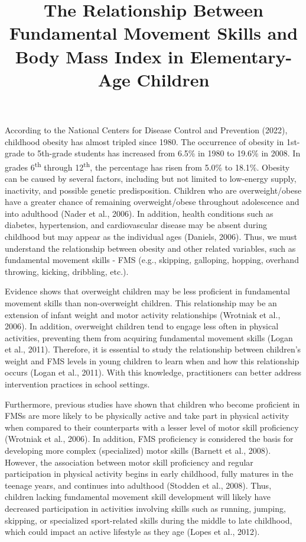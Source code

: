 \documentclass[
  jou,
  colorlinks=true,linkcolor=blue,citecolor=blue,urlcolor=blue]{apa7}
\title{The Relationship Between Fundamental Movement Skills and Body
Mass Index in Elementary-Age Children}
\date{}
\begin{document}
\maketitle
\ifdefined\Shaded\renewenvironment{Shaded}{\begin{tcolorbox}[boxrule=0pt, interior hidden, borderline west={3pt}{0pt}{shadecolor}, enhanced, frame hidden, breakable, sharp corners]}{\end{tcolorbox}}\fi
According to the National Centers for Disease Control and Prevention
(2022), childhood obesity has almost tripled since 1980. The occurrence
of obesity in 1st-grade to 5th-grade students has increased from 6.5\%
in 1980 to 19.6\% in 2008. In grades 6\textsuperscript{th} through
12\textsuperscript{th}, the percentage has risen from 5.0\% to 18.1\%.
Obesity can be caused by several factors, including but not limited to
low-energy supply, inactivity, and possible genetic predisposition.
Children who are overweight/obese have a greater chance of remaining
overweight/obese throughout adolescence and into adulthood (Nader et
al., 2006). In addition, health conditions such as diabetes,
hypertension, and cardiovascular disease may be absent during childhood
but may appear as the individual ages (Daniels, 2006). Thus, we must
understand the relationship between obesity and other related variables,
such as fundamental movement skills - FMS (e.g., skipping, galloping,
hopping, overhand throwing, kicking, dribbling, etc.).

Evidence shows that overweight children may be less proficient in
fundamental movement skills than non-overweight children. This
relationship may be an extension of infant weight and motor activity
relationships (Wrotniak et al., 2006). In addition, overweight children
tend to engage less often in physical activities, preventing them from
acquiring fundamental movement skills (Logan et al., 2011). Therefore,
it is essential to study the relationship between children's weight and
FMS levels in young children to learn when and how this relationship
occurs (Logan et al., 2011). With this knowledge, practitioners can
better address intervention practices in school settings.

Furthermore, previous studies have shown that children who become
proficient in FMSs are more likely to be physically active and take part
in physical activity when compared to their counterparts with a lesser
level of motor skill proficiency (Wrotniak et al., 2006). In addition,
FMS proficiency is considered the basis for developing more complex
(specialized) motor skills (Barnett et al., 2008). However, the
association between motor skill proficiency and regular participation in
physical activity begins in early childhood, fully matures in the
teenage years, and continues into adulthood (Stodden et al., 2008).
Thus, children lacking fundamental movement skill development will
likely have decreased participation in activities involving skills such
as running, jumping, skipping, or specialized sport-related skills
during the middle to late childhood, which could impact an active
lifestyle as they age (Lopes et al., 2012).
\end{document}
